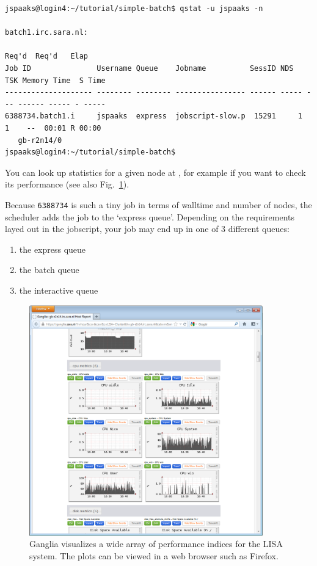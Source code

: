 \begin{lstlisting}[style=basic,style=bash,xrightmargin=-10mm]
jspaaks@login4:~/tutorial/simple-batch$ qstat -u jspaaks -n

batch1.irc.sara.nl: 
                                                                         Req'd  Req'd   Elap
Job ID               Username Queue    Jobname          SessID NDS   TSK Memory Time  S Time
-------------------- -------- -------- ---------------- ------ ----- --- ------ ----- - -----
6388734.batch1.i     jspaaks  express  jobscript-slow.p  15291     1   1    --  00:01 R 00:00
   gb-r2n14/0
jspaaks@login4:~/tutorial/simple-batch$ 
\end{lstlisting}
You can look up statistics for a given node at  , for example if you want to check its performance (see also Fig.~\ref{fig:ganglia-screenshot}).

Because \lstinline[style=bashinline]{6388734} is such a tiny job in terms of walltime and number of nodes, the scheduler adds the job to the `express queue'. Depending on the requirements layed out in the jobscript, your job may end up in one of 3 different queues:
\begin{enumerate}
\item{the express queue}
\item{the batch queue}
\item{the interactive queue}
\end{enumerate}

\begin{figure}[hbt]
  \centering
    \includegraphics[width=0.9\textwidth]{./../eps/ganglia-screenshot.eps}
  \caption{Ganglia visualizes a wide array of performance indices for the LISA system. The plots can be viewed in a web browser such as Firefox.}
  \label{fig:ganglia-screenshot}
\end{figure}


